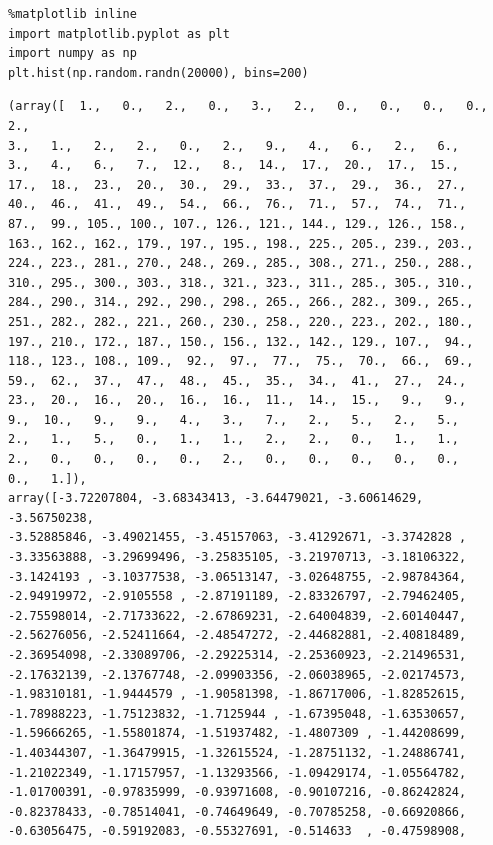 \documentclass[11pt]{article}
\author{Josh Kwok}
\date{\today}
\title{}
\begin{document}
\tableofcontents \clearpage\begin{verbatim}
%matplotlib inline
import matplotlib.pyplot as plt
import numpy as np
plt.hist(np.random.randn(20000), bins=200)
\end{verbatim}

\begin{verbatim}
(array([  1.,   0.,   2.,   0.,   3.,   2.,   0.,   0.,   0.,   0.,   2.,
3.,   1.,   2.,   2.,   0.,   2.,   9.,   4.,   6.,   2.,   6.,
3.,   4.,   6.,   7.,  12.,   8.,  14.,  17.,  20.,  17.,  15.,
17.,  18.,  23.,  20.,  30.,  29.,  33.,  37.,  29.,  36.,  27.,
40.,  46.,  41.,  49.,  54.,  66.,  76.,  71.,  57.,  74.,  71.,
87.,  99., 105., 100., 107., 126., 121., 144., 129., 126., 158.,
163., 162., 162., 179., 197., 195., 198., 225., 205., 239., 203.,
224., 223., 281., 270., 248., 269., 285., 308., 271., 250., 288.,
310., 295., 300., 303., 318., 321., 323., 311., 285., 305., 310.,
284., 290., 314., 292., 290., 298., 265., 266., 282., 309., 265.,
251., 282., 282., 221., 260., 230., 258., 220., 223., 202., 180.,
197., 210., 172., 187., 150., 156., 132., 142., 129., 107.,  94.,
118., 123., 108., 109.,  92.,  97.,  77.,  75.,  70.,  66.,  69.,
59.,  62.,  37.,  47.,  48.,  45.,  35.,  34.,  41.,  27.,  24.,
23.,  20.,  16.,  20.,  16.,  16.,  11.,  14.,  15.,   9.,   9.,
9.,  10.,   9.,   9.,   4.,   3.,   7.,   2.,   5.,   2.,   5.,
2.,   1.,   5.,   0.,   1.,   1.,   2.,   2.,   0.,   1.,   1.,
2.,   0.,   0.,   0.,   0.,   2.,   0.,   0.,   0.,   0.,   0.,
0.,   1.]),
array([-3.72207804, -3.68343413, -3.64479021, -3.60614629, -3.56750238,
-3.52885846, -3.49021455, -3.45157063, -3.41292671, -3.3742828 ,
-3.33563888, -3.29699496, -3.25835105, -3.21970713, -3.18106322,
-3.1424193 , -3.10377538, -3.06513147, -3.02648755, -2.98784364,
-2.94919972, -2.9105558 , -2.87191189, -2.83326797, -2.79462405,
-2.75598014, -2.71733622, -2.67869231, -2.64004839, -2.60140447,
-2.56276056, -2.52411664, -2.48547272, -2.44682881, -2.40818489,
-2.36954098, -2.33089706, -2.29225314, -2.25360923, -2.21496531,
-2.17632139, -2.13767748, -2.09903356, -2.06038965, -2.02174573,
-1.98310181, -1.9444579 , -1.90581398, -1.86717006, -1.82852615,
-1.78988223, -1.75123832, -1.7125944 , -1.67395048, -1.63530657,
-1.59666265, -1.55801874, -1.51937482, -1.4807309 , -1.44208699,
-1.40344307, -1.36479915, -1.32615524, -1.28751132, -1.24886741,
-1.21022349, -1.17157957, -1.13293566, -1.09429174, -1.05564782,
-1.01700391, -0.97835999, -0.93971608, -0.90107216, -0.86242824,
-0.82378433, -0.78514041, -0.74649649, -0.70785258, -0.66920866,
-0.63056475, -0.59192083, -0.55327691, -0.514633  , -0.47598908,

\end{verbatim}
\end{document}
